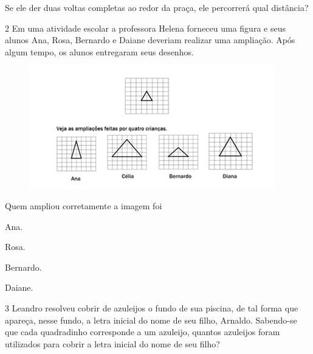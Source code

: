 Se ele der duas voltas completas ao redor da praça, ele percorrerá qual
distância?



\num{2} Em uma atividade escolar a professora Helena forneceu uma figura e
seus alunos Ana, Rosa, Bernardo e Daiane deveriam realizar uma ampliação. Após algum tempo, os alunos entregaram seus desenhos.

\begin{figure}[htpb!]
\includegraphics[width=.5\textwidth]{./imgs/mat5.png}
\end{figure}

Quem ampliou corretamente a imagem foi

\begin{escolha}
\item
  Ana.
\item
  Rosa.
\item
  Bernardo.
\item
  Daiane.
\end{escolha}


\num{3} Leandro resolveu cobrir de azuleijos o fundo de sua piscina, de tal
forma que apareça, nesse fundo, a letra inicial do nome de seu filho,
Arnaldo. Sabendo-se que cada quadradinho corresponde a um azuleijo,
quantos azuleijos foram utilizados para cobrir a letra inicial do nome
de seu filho?

